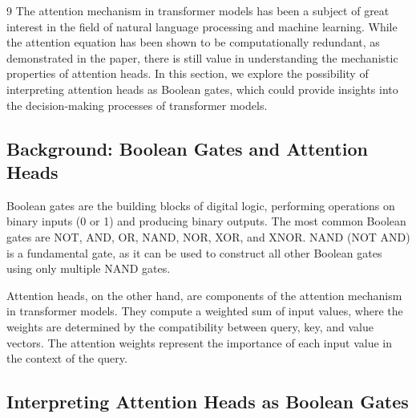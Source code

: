 \documentclass[11pt]{article}
\theoremstyle{definition}
\begin{document}
\begin{thebibliography}{9}
The attention mechanism in transformer models has been a subject of great interest in the field of natural language processing and machine learning. While the attention equation has been shown to be computationally redundant, as demonstrated in the paper, there is still value in understanding the mechanistic properties of attention heads. In this section, we explore the possibility of interpreting attention heads as Boolean gates, which could provide insights into the decision-making processes of transformer models.













\subsection{Background: Boolean Gates and Attention Heads}













Boolean gates are the building blocks of digital logic, performing operations on binary inputs (0 or 1) and producing binary outputs. The most common Boolean gates are NOT, AND, OR, NAND, NOR, XOR, and XNOR. NAND (NOT AND) is a fundamental gate, as it can be used to construct all other Boolean gates using only multiple NAND gates.













Attention heads, on the other hand, are components of the attention mechanism in transformer models. They compute a weighted sum of input values, where the weights are determined by the compatibility between query, key, and value vectors. The attention weights represent the importance of each input value in the context of the query.













\subsection{Interpreting Attention Heads as Boolean Gates}














\end{thebibliography}
\end{document}
